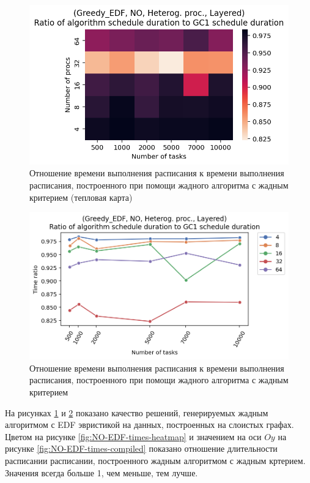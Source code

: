 \begin{figure}[!htbp]
    \centering
    \includegraphics[width=\textwidth]{imgs/unbalanced/NO_EDF/times.png}
    \caption{Отношение времени выполнения расписания к времени выполнения расписания, построенного при помощи жадного алгоритма с жадным критерием (тепловая карта)}
    \label{fig:NO-disbalanced-EDF-times-heatmap}
\end{figure}

\begin{figure}[!htbp]
    \centering
    \includegraphics[width=\textwidth]{imgs/unbalanced/NO_EDF/gr_amalgamated.png}
    \caption{Отношение времени выполнения расписания к времени выполнения расписания, построенного при помощи жадного алгоритма с жадным критерием}
    \label{fig:NO-disbalanced-EDF-times-compiled}
\end{figure}

На рисунках \ref{fig:NO-disbalanced-EDF-times-heatmap} и \ref{fig:NO-disbalanced-EDF-times-compiled} показано качество решений, генерируемых жадным алгоритмом с EDF эвристикой на данных, построенных на слоистых графах. Цветом на рисунке \ref{fig:NO-EDF-times-heatmap} и значением на оси $Oy$ на рисунке \ref{fig:NO-EDF-times-compiled} показано отношение длительности расписании расписании, построенного жадным алгоритмом с жадным кртерием. Значения всегда больше 1, чем меньше, тем лучше.

